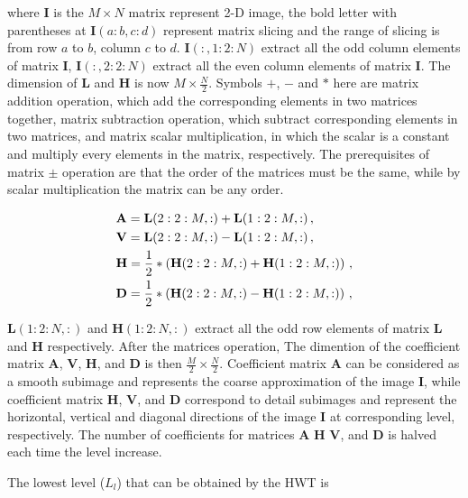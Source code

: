 where $\mathbf I$ is the $M \times N$ matrix represent 2-D image, the bold letter with parentheses at $\mathbf I\left( a:b, c:d \right)$ represent matrix slicing and the range of slicing is from row $a$ to $b$, column $c$ to $d$. $\mathbf I\left(:, 1:2:N\right)$ extract all the odd column elements of matrix $\mathbf I$, $\mathbf I\left(:, 2:2:N\right)$ extract all the even column elements of matrix $\mathbf I$. The dimension of $\mathbf L$ and $\mathbf H$ is now $M \times \frac{N}{2}$. Symbols $+$, $-$ and $*$ here are matrix addition operation, which add the corresponding elements in two matrices together, matrix subtraction operation, which subtract corresponding elements in two matrices, and matrix scalar multiplication, in which the scalar is a constant and multiply every elements in the matrix, respectively. The prerequisites of matrix $\pm$ operation are that the order of the matrices must be the same, while by scalar multiplication the matrix can be any order.

\begin{equation}
\begin{aligned}
\centering&\mathbf A=\mathbf L(2:2:M,:)+\mathbf L(1:2:M,:)\,,\\
\centering&\mathbf V=\mathbf L(2:2:M,:)-\mathbf L(1:2:M,:)\,, \\
\centering&\mathbf H=\frac{1}{2} * \left(\mathbf H(2:2:M,:)+\mathbf H(1:2:M,:)\right)\,,\\
\centering&\mathbf D=\frac{1}{2} * \left(\mathbf H(2:2:M,:)-\mathbf H(1:2:M,:)\right)\,,
\label{equ:haar_wavelet2}
\end{aligned}    
\end{equation}

$\mathbf L(1:2:N,:)$ and $\mathbf H( 1:2:N,:)$ extract all the odd row elements of matrix $\mathbf L$ and $\mathbf H$ respectively. After the matrices operation, The dimention of the coefficient matrix $\mathbf A$, $\mathbf V$, $\mathbf H$, and $\mathbf D$ is then $\frac{M}{2} \times \frac{N}{2}$. Coefficient matrix $\mathbf A$ can be considered as a smooth subimage and represents the coarse approximation of the image $\mathbf I$, while coefficient matrix $\mathbf H$, $\mathbf V$, and $\mathbf D$ correspond to detail subimages and represent the horizontal, vertical and diagonal directions of the image $\mathbf I$ at corresponding level, respectively. The number of coefficients for matrices $\mathbf A$ $\mathbf H$ $\mathbf V$, and $\mathbf D$ is halved each time the level increase.


The lowest level ($L_l$) that can be obtained by the HWT is

